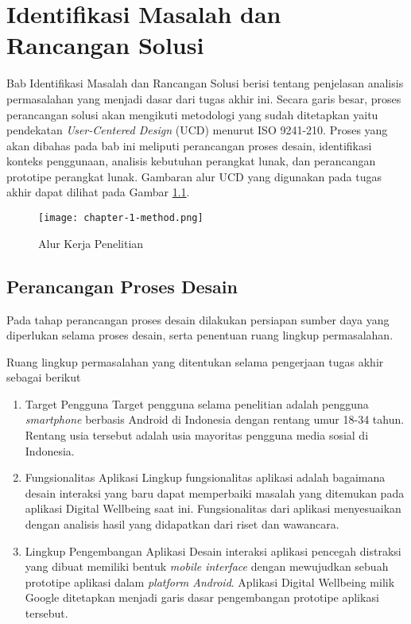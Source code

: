 \chapter{Identifikasi Masalah dan Rancangan Solusi}

\newcommand{\ccnormspacing}{\baselineskip=12pt}
\newcommand{\ccnormspacingcenter}{\centering\arraybackslash\ccnormspacing}

Bab Identifikasi Masalah dan Rancangan Solusi berisi tentang penjelasan analisis permasalahan yang menjadi dasar dari tugas akhir ini. Secara garis besar, proses perancangan solusi akan mengikuti metodologi yang sudah ditetapkan yaitu pendekatan \textit{User-Centered Design} (UCD) menurut ISO 9241-210. Proses yang akan dibahas pada bab ini meliputi perancangan proses desain, identifikasi konteks penggunaan, analisis kebutuhan perangkat lunak, dan perancangan prototipe perangkat lunak. Gambaran alur UCD yang digunakan pada tugas akhir dapat dilihat pada Gambar \ref{fig:diagram_alur_kerja}.

\begin{figure}[h]
  \centering
  \texttt{[image: chapter-1-method.png]}
  \caption{Alur Kerja Penelitian}
  \label{fig:diagram_alur_kerja}
\end{figure}

\section{Perancangan Proses Desain}
\label{sec:perancangan_proses_desain}

Pada tahap perancangan proses desain dilakukan persiapan sumber daya yang diperlukan selama proses desain, serta penentuan ruang lingkup permasalahan.


Ruang lingkup permasalahan yang ditentukan selama pengerjaan tugas akhir sebagai berikut

\begin{enumerate}
  \item Target Pengguna
  \subitem Target pengguna selama penelitian adalah pengguna \textit{smartphone} berbasis Android di Indonesia dengan rentang umur 18-34 tahun. Rentang usia tersebut adalah usia mayoritas pengguna media sosial di Indonesia. \parencite{mediasosial2020} 
  
  \item Fungsionalitas Aplikasi
  \subitem Lingkup fungsionalitas aplikasi adalah bagaimana desain interaksi yang baru dapat memperbaiki masalah yang ditemukan pada aplikasi Digital Wellbeing saat ini. Fungsionalitas dari aplikasi menyesuaikan dengan analisis hasil yang didapatkan dari riset dan wawancara. 
   
  \item Lingkup Pengembangan Aplikasi
  \subitem Desain interaksi aplikasi pencegah distraksi yang dibuat memiliki bentuk \textit{mobile interface} dengan mewujudkan sebuah prototipe aplikasi dalam \textit{platform Android}. Aplikasi Digital Wellbeing milik Google ditetapkan menjadi garis dasar pengembangan prototipe aplikasi tersebut.

\end{enumerate}

